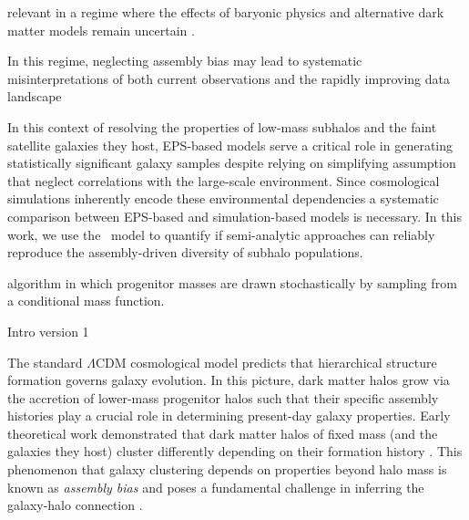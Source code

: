 relevant in a regime where the effects of baryonic physics \citep{Garrison-Kimmel.etal.14, Wetzel.etal.16, Garrison-Kimmel.etal.17} and alternative dark matter models \citep{Nadler.etal.25} remain uncertain \citep{Sales.etal.22}.

In this regime, neglecting assembly bias may lead to systematic misinterpretations of both current observations and the rapidly improving data landscape

In this context of resolving the properties of low-mass subhalos and the faint satellite galaxies they host, EPS-based models serve a critical role in generating statistically significant galaxy samples \citep{Jiang.etal.21, Green.etal.21, Folsom.etal.2023, Monzon.etal.24, Dropulic.etal.25, Monzon.etal.26} despite relying on simplifying assumption that neglect correlations with the large-scale environment. Since cosmological simulations inherently encode these environmental dependencies a systematic comparison between EPS-based and simulation-based models is necessary. In this work, we use the \SatGen\ model \citep{Jiang.etal.21, Green.etal.21} to quantify if semi-analytic approaches can reliably reproduce the assembly-driven diversity of subhalo populations.

\cite{Parkinson.etal.08} algorithm in which progenitor masses are drawn stochastically by sampling from a conditional mass function.





Intro version 1

The standard $\Lambda$CDM cosmological model predicts that hierarchical structure formation governs galaxy evolution. In this picture, dark matter halos grow via the accretion of lower-mass progenitor halos such that their specific assembly histories play a crucial role in determining present-day galaxy properties. Early theoretical work demonstrated that dark matter halos of fixed mass (and the galaxies they host) cluster differently depending on their formation history \citep{Zheng.etal.05, Zentner.etal.05, Wechsler.etal.06, Dalal.etal.08, Giocoli.etal.10}. This phenomenon that galaxy clustering depends on properties beyond halo mass is known as \textit{assembly bias} and poses a fundamental challenge in inferring the galaxy-halo connection \citep{Zentner.etal.14}.


